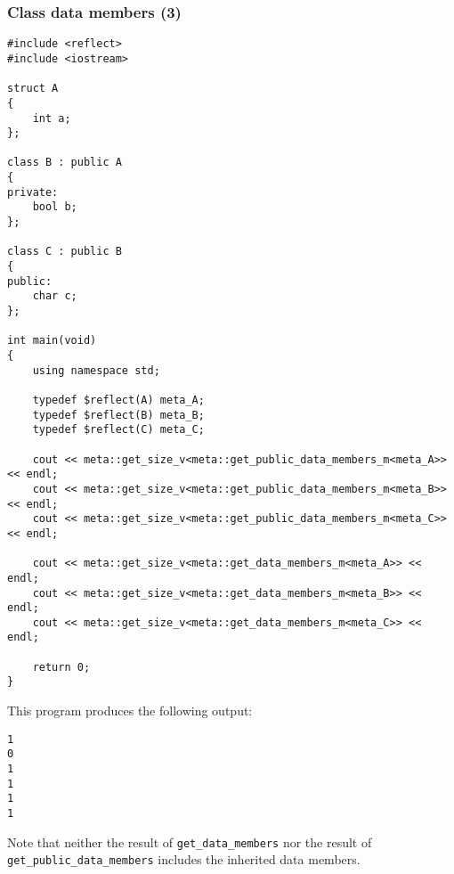 \subsubsection{Class data members (3)}

\begin{verbatim}
#include <reflect>
#include <iostream>

struct A
{
	int a;
};

class B : public A
{
private:
	bool b;
};

class C : public B
{
public:
	char c;
};

int main(void)
{
	using namespace std;

	typedef $reflect(A) meta_A;
	typedef $reflect(B) meta_B;
	typedef $reflect(C) meta_C;

	cout << meta::get_size_v<meta::get_public_data_members_m<meta_A>> << endl;
	cout << meta::get_size_v<meta::get_public_data_members_m<meta_B>> << endl;
	cout << meta::get_size_v<meta::get_public_data_members_m<meta_C>> << endl;

	cout << meta::get_size_v<meta::get_data_members_m<meta_A>> << endl;
	cout << meta::get_size_v<meta::get_data_members_m<meta_B>> << endl;
	cout << meta::get_size_v<meta::get_data_members_m<meta_C>> << endl;

	return 0;
}
\end{verbatim}

This program produces the following output:

\begin{verbatim}
1
0
1
1
1
1
\end{verbatim}

Note that neither the result of \texttt{get\_data\_members} nor the result of
\texttt{get\_public\_data\_members} includes the inherited data members.
